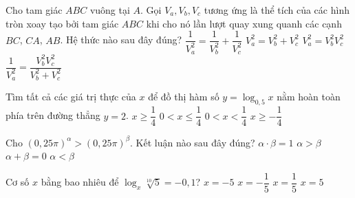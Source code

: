 \begin{ex}%
    Cho tam giác $ABC$ vuông tại $A$. Gọi $V_a,V_b,V_c$ tương ứng là thể tích của các hình tròn xoay tạo bởi tam giác $ABC$ khi cho nó lần lượt quay xung quanh các cạnh $BC$, $CA$, $AB$. Hệ thức nào sau đây đúng?
    \choice
    {\True $\dfrac{1}{V_a^2}=\dfrac{1}{V_b^2}+\dfrac{1}{V_c^2}$}
    {$V_a^2=V_b^2+V_c^2$}
    {$V_a^2=V_b^2 V_c^2$}
    {$\dfrac{1}{V_a^2}=\dfrac{V_b^2V_c^2}{V_b^2+V_c^2}$}
\end{ex}

\begin{ex}%
    Tìm tất cả các giá trị thực của $x$ để đồ thị hàm số $y=\log_{0{,}5}x$ nằm hoàn toàn phía trên đường thẳng $y=2$.
    \choice
    {$x\ge \dfrac{1}{4}$}
    {$0<x\le \dfrac{1}{4}$}
    {\True $0<x<\dfrac{1}{4}$}
    {$x\ge -\dfrac{1}{4}$}
\end{ex}

\begin{ex}%
    Cho $\left(0{,}25\pi\right)^{\alpha}>\left(0{,}25\pi\right)^{\beta}$. Kết luận nào sau đây đúng?
    \choice
    {$\alpha\cdot \beta=1$}
    {$\alpha>\beta$}
    {$\alpha+\beta=0$}
    {\True $\alpha<\beta$}
\end{ex}

\begin{ex}%
    Cơ số $x$ bằng bao nhiêu để $\log_x \sqrt[10]{5}=-0{,}1$?
    \choice
    {$x=-5$}
    {$x=-\dfrac{1}{5}$}
    {\True $x=\dfrac{1}{5}$}
    {$x=5$}
\end{ex}

